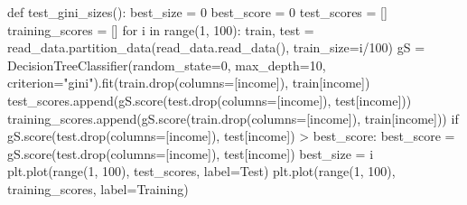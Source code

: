 \documentclass[
  letterpaper,
  DIV=11,
  numbers=noendperiod]{scrartcl}
\newenvironment{Shaded}{\begin{snugshade}}{\end{snugshade}}
\newcommand{\BuiltInTok}[1]{\textcolor[rgb]{0.00,0.23,0.31}{#1}}
\newcommand{\ControlFlowTok}[1]{\textcolor[rgb]{0.00,0.23,0.31}{#1}}
\newcommand{\DecValTok}[1]{\textcolor[rgb]{0.68,0.00,0.00}{#1}}
\newcommand{\KeywordTok}[1]{\textcolor[rgb]{0.00,0.23,0.31}{#1}}
\newcommand{\NormalTok}[1]{\textcolor[rgb]{0.00,0.23,0.31}{#1}}
\newcommand{\OperatorTok}[1]{\textcolor[rgb]{0.37,0.37,0.37}{#1}}
\newcommand{\StringTok}[1]{\textcolor[rgb]{0.13,0.47,0.30}{#1}}
\begin{document}
\begin{Shaded}
\begin{Highlighting}[]
\KeywordTok{def}\NormalTok{ test\_gini\_sizes():}
\NormalTok{    best\_size }\OperatorTok{=} \DecValTok{0}
\NormalTok{    best\_score }\OperatorTok{=} \DecValTok{0}
\NormalTok{    test\_scores }\OperatorTok{=}\NormalTok{ []}
\NormalTok{    training\_scores }\OperatorTok{=}\NormalTok{ []}
    \ControlFlowTok{for}\NormalTok{ i }\KeywordTok{in} \BuiltInTok{range}\NormalTok{(}\DecValTok{1}\NormalTok{, }\DecValTok{100}\NormalTok{):}
\NormalTok{        train, test }\OperatorTok{=}\NormalTok{ read\_data.partition\_data(read\_data.read\_data(), train\_size}\OperatorTok{=}\NormalTok{i}\OperatorTok{/}\DecValTok{100}\NormalTok{)}
\NormalTok{        gS }\OperatorTok{=}\NormalTok{ DecisionTreeClassifier(random\_state}\OperatorTok{=}\DecValTok{0}\NormalTok{, max\_depth}\OperatorTok{=}\DecValTok{10}\NormalTok{, }
\NormalTok{            criterion}\OperatorTok{=}\StringTok{"gini"}\NormalTok{).fit(train.drop(columns}\OperatorTok{=}\NormalTok{[}\StringTok{\textquotesingle{}income\textquotesingle{}}\NormalTok{]), train[}\StringTok{\textquotesingle{}income\textquotesingle{}}\NormalTok{])}
\NormalTok{        test\_scores.append(gS.score(test.drop(columns}\OperatorTok{=}\NormalTok{[}\StringTok{\textquotesingle{}income\textquotesingle{}}\NormalTok{]), test[}\StringTok{\textquotesingle{}income\textquotesingle{}}\NormalTok{]))}
\NormalTok{        training\_scores.append(gS.score(train.drop(columns}\OperatorTok{=}\NormalTok{[}\StringTok{\textquotesingle{}income\textquotesingle{}}\NormalTok{]), train[}\StringTok{\textquotesingle{}income\textquotesingle{}}\NormalTok{]))}
        \ControlFlowTok{if}\NormalTok{ gS.score(test.drop(columns}\OperatorTok{=}\NormalTok{[}\StringTok{\textquotesingle{}income\textquotesingle{}}\NormalTok{]), test[}\StringTok{\textquotesingle{}income\textquotesingle{}}\NormalTok{]) }\OperatorTok{\textgreater{}}\NormalTok{ best\_score:}
\NormalTok{            best\_score }\OperatorTok{=}\NormalTok{ gS.score(test.drop(columns}\OperatorTok{=}\NormalTok{[}\StringTok{\textquotesingle{}income\textquotesingle{}}\NormalTok{]), test[}\StringTok{\textquotesingle{}income\textquotesingle{}}\NormalTok{])}
\NormalTok{            best\_size }\OperatorTok{=}\NormalTok{ i}
\NormalTok{    plt.plot(}\BuiltInTok{range}\NormalTok{(}\DecValTok{1}\NormalTok{, }\DecValTok{100}\NormalTok{), test\_scores, label}\OperatorTok{=}\StringTok{\textquotesingle{}Test\textquotesingle{}}\NormalTok{)}
\NormalTok{    plt.plot(}\BuiltInTok{range}\NormalTok{(}\DecValTok{1}\NormalTok{, }\DecValTok{100}\NormalTok{), training\_scores, label}\OperatorTok{=}\StringTok{\textquotesingle{}Training\textquotesingle{}}\NormalTok{)}

\end{Highlighting}
\end{Shaded}
\end{document}
